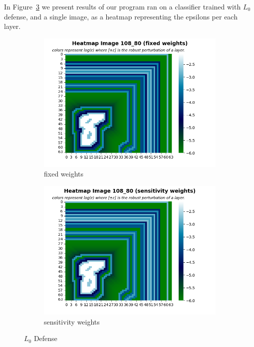      In Figure~\ref{fig:L0 defense} we present results of our program ran on a classifier trained with $L_0$ defense, and a single image, as a heatmap representing the epsilons per each layer.
    \begin{figure}
         \centering
         \begin{subfigure}[b]{0.4\textwidth}
             \centering
             \includegraphics[width=\textwidth]{l0_defense_fixed_weights.png}
             \caption{fixed weights}
             \label{sub-fig:L0 defense FW}
         \end{subfigure}
         \hfill
         \begin{subfigure}[b]{0.4\textwidth}
             \centering
             \includegraphics[width=\textwidth]{l0_defense_sensitivity_weights.png}
             \caption{sensitivity weights}
             \label{sub-fig:L0 defense SW}
         \end{subfigure}
         \caption{$L_0$ Defense}
         \label{fig:L0 defense}
    \end{figure}
